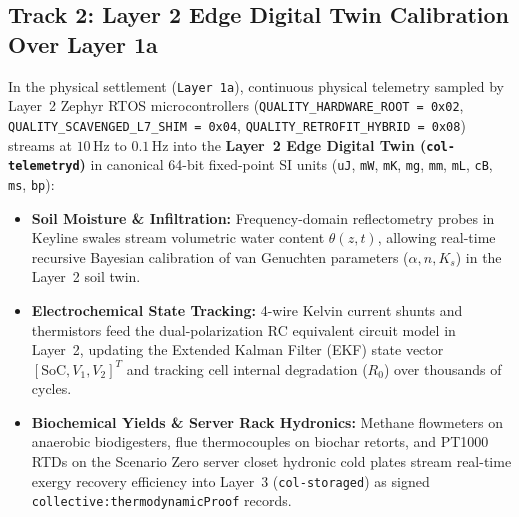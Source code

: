 \subsection{Track 2: Layer 2 Edge Digital Twin Calibration Over Layer 1a}
In the physical settlement (\texttt{Layer 1a}), continuous physical telemetry sampled by Layer~2 Zephyr RTOS microcontrollers (\texttt{QUALITY\_HARDWARE\_ROOT = 0x02}, \texttt{QUALITY\_SCAVENGED\_L7\_SHIM = 0x04}, \texttt{QUALITY\_RETROFIT\_HYBRID = 0x08}) streams at $10\,\mathrm{Hz}$ to $0.1\,\mathrm{Hz}$ into the \textbf{Layer~2 Edge Digital Twin (\texttt{col-telemetryd})} in canonical 64-bit fixed-point SI units (\texttt{uJ}, \texttt{mW}, \texttt{mK}, \texttt{mg}, \texttt{mm}, \texttt{mL}, \texttt{cB}, \texttt{ms}, \texttt{bp}):
\begin{itemize}
    \item \textbf{Soil Moisture \& Infiltration:} Frequency-domain reflectometry probes in Keyline swales stream volumetric water content $\theta(z, t)$, allowing real-time recursive Bayesian calibration of van Genuchten parameters ($\alpha, n, K_s$) in the Layer~2 soil twin.
    \item \textbf{Electrochemical State Tracking:} 4-wire Kelvin current shunts and thermistors feed the dual-polarization RC equivalent circuit model in Layer~2, updating the Extended Kalman Filter (EKF) state vector $[\mathrm{SoC}, V_1, V_2]^T$ and tracking cell internal degradation ($R_0$) over thousands of cycles.
    \item \textbf{Biochemical Yields \& Server Rack Hydronics:} Methane flowmeters on anaerobic biodigesters, flue thermocouples on biochar retorts, and PT1000 RTDs on the Scenario Zero server closet hydronic cold plates stream real-time exergy recovery efficiency into Layer~3 (\texttt{col-storaged}) as signed \texttt{collective:thermodynamicProof} records.
\end{itemize}

